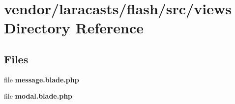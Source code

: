 \section{vendor/laracasts/flash/src/views Directory Reference}
\label{dir_1d4b95dd5c7b4e4dd88a9927714993b9}
\subsection*{Files}
\begin{DoxyCompactItemize}
\item 
file {\bf message.\+blade.\+php}
\item 
file {\bf modal.\+blade.\+php}
\end{DoxyCompactItemize}
